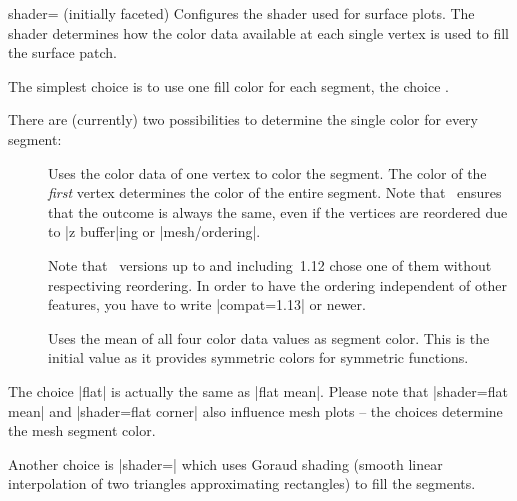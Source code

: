 {\begin{pgfplotskey}{shader= (initially faceted)}
	Configures the shader used for surface plots. The shader determines how the color data available at each single vertex is used to fill the surface patch.

	The simplest choice is to use one fill color for each segment, the choice .

\pgfplotsexpensiveexample
\begin{codeexample}[]
\end{codeexample}

	\noindent There are (currently) two possibilities to determine the single color for every segment:
	\begin{description}
		\item[] Uses the color data of one vertex to color the segment. The color of the \emph{first} vertex determines the color of the entire segment. Note that \PGFPlots\ ensures that the outcome is always the same, even if the vertices are reordered due to |z buffer|ing or |mesh/ordering|. 

		Note that \PGFPlots\ versions up to and including~1.12 chose one of them without respectiving reordering. In order to have the ordering independent of other features, you have to write |compat=1.13| or newer.
		

		\item[] Uses the mean of all four color data values as segment color. This is the initial value as it provides symmetric colors for symmetric functions.
	\end{description}
	The choice |flat| is actually the same as |flat mean|. Please note that |shader=flat mean| and |shader=flat corner| also influence mesh plots -- the choices determine the mesh segment color.

	Another choice is |shader=| which uses Goraud shading (smooth linear interpolation of two triangles approximating rectangles) to fill the segments. 

\pgfplotsexpensiveexample
\begin{codeexample}[]
\end{codeexample}


\end{pgfplotskey}}
